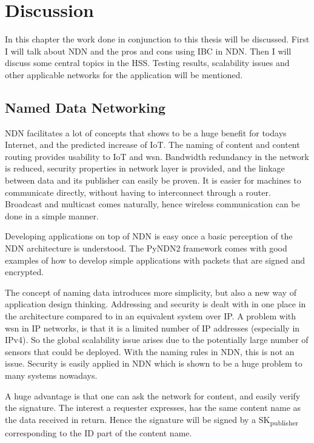 \chapter{Discussion}
In this chapter the work done in conjunction to this thesis will be discussed. 
First I will talk about \gls{NDN} and the pros and cons using \gls{IBC} in \gls{NDN}.
Then I will discuss some central topics in the \gls{HSS}. 
Testing results, scalability issues and other applicable networks for the application will be mentioned.

\section{Named Data Networking}
\gls{NDN} facilitates a lot of concepts that shows to be a huge benefit for todays Internet, and the predicted increase of \gls{IoT}.
The naming of content and content routing provides usability to \gls{IoT} and \gls{wsn}.
Bandwidth redundancy in the network is reduced, security properties in network layer is provided, and the linkage between data and its publisher can easily be proven. 
It is easier for machines to communicate directly, without having to interconnect through a router.
Broadcast and multicast comes naturally, hence wireless communication can be done in a simple manner.

Developing applications on top of \gls{NDN} is easy once a basic perception of the \gls{NDN} architecture is understood.
The \gls{PyNDN2} framework comes with good examples of how to develop simple applications with packets that are signed and encrypted.

The concept of naming data introduces more simplicity, but also a new way of application design thinking.
Addressing and security is dealt with in one place in the architecture compared to in an equivalent system over \gls{IP}. 
A problem with \gls{wsn} in \gls{IP} networks, is that it is a limited number of \gls{IP} addresses (especially in \gls{IPv4}).
So the global scalability issue arises due to the potentially large number of sensors that could be deployed. 
With the naming rules in \gls{NDN}, this is not an issue.
Security is easily applied in \gls{NDN} which is shown to be a huge problem to many systems nowadays.

A huge advantage is that one can ask the network for content, and easily verify the signature.
The \gls{interest} a \gls{requester} expresses, has the same content \gls{name} as the \gls{data} received in return.
Hence the signature will be signed by a \gls{SK}\textsubscript{publisher} corresponding to the \gls{ID} part of the content \gls{name}.

